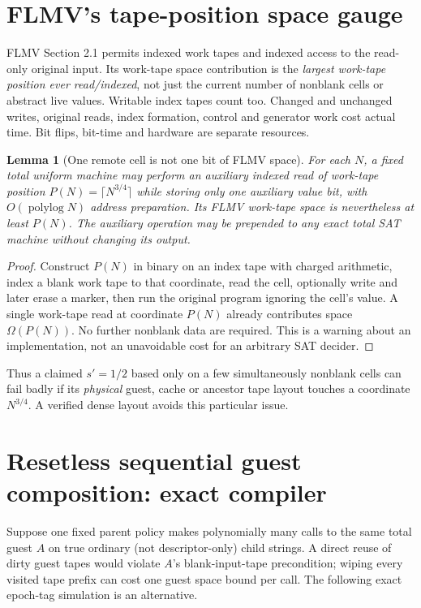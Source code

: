 \documentclass[11pt]{article}
\newtheorem{lemma}[theorem]{Lemma}
\begin{document}
\section{FLMV's tape-position space gauge}
FLMV Section 2.1 permits indexed work tapes and indexed access to the read-only original input. Its work-tape space contribution is the \emph{largest work-tape position ever read/indexed}, not just the current number of nonblank cells or abstract live values. Writable index tapes count too. Changed and unchanged writes, original reads, index formation, control and generator work cost actual time. Bit flips, bit-time and hardware are separate resources.

\begin{lemma}[One remote cell is not one bit of FLMV space]\label{lem:far}
For each $N$, a fixed total uniform machine may perform an auxiliary indexed read of work-tape position $P(N)=\lceil N^{3/4}\rceil$ while storing only one auxiliary value bit, with $O(\operatorname{polylog}N)$ address preparation. Its FLMV work-tape space is nevertheless at least $P(N)$. The auxiliary operation may be prepended to any exact total SAT machine without changing its output.
\end{lemma}
\begin{proof}
Construct $P(N)$ in binary on an index tape with charged arithmetic, index a blank work tape to that coordinate, read the cell, optionally write and later erase a marker, then run the original program ignoring the cell's value. A single work-tape read at coordinate $P(N)$ already contributes space $\Omega(P(N))$. No further nonblank data are required. This is a warning about an implementation, not an unavoidable cost for an arbitrary SAT decider.
\end{proof}
Thus a claimed $s'=1/2$ based only on a few simultaneously nonblank cells can fail badly if its \emph{physical} guest, cache or ancestor tape layout touches a coordinate $N^{3/4}$. A verified dense layout avoids this particular issue.

\section{Resetless sequential guest composition: exact compiler}
Suppose one fixed parent policy makes polynomially many calls to the same total guest $A$ on true ordinary (not descriptor-only) child strings. A direct reuse of dirty guest tapes would violate $A$'s blank-input-tape precondition; wiping every visited tape prefix can cost one guest space bound per call. The following exact epoch-tag simulation is an alternative.
\end{document}
